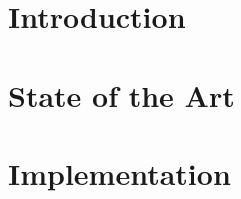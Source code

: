 \documentclass[11pt]{report}
\begin{document}









\tableofcontents

\listoffigures

\listoftables 

\pagestyle{headings}

\chapter{Introduction}
\label{sec:intro}


\chapter{State of the Art}
\label{sec:sota}


\chapter{Implementation}
\label{sec:imp}


\newpage


\end{document}
